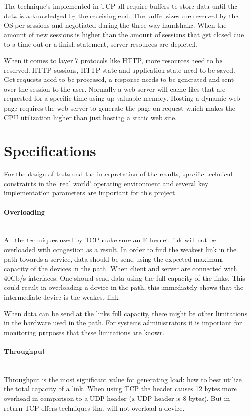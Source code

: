 The technique's implemented in TCP all require buffers to store data until the data is acknowledged by the receiving end.
The buffer sizes are reserved by the OS per sessions and negotiated during the three way handshake.  
When the amount of new sessions is higher than the amount of sessions that get closed due to a time-out or a finish statement, server resources are depleted.

When it comes to layer 7 protocols like HTTP, more resources need to be reserved. HTTP sessions, HTTP state and application state need to be saved. Get requests need to be processed, a response needs to be generated and sent over the session to the user. Normally a web server will cache files that are requested for a specific time using up valuable memory. Hosting a dynamic web page requires the web server to generate the page on request which makes the CPU utilization higher than just hosting a static web site. 

\section{Specifications}\label{sec:specifications}
For the design of tests and the interpretation of the results, specific technical constraints in the 'real world' operating environment and several key implementation parameters are important for this project.

\paragraph{Overloading}\label{par:overload}\mbox{}\\
All the techniques used by TCP make sure an Ethernet link will not be overloaded with congestion as a result. 
In order to find the weakest link in the path towards a service, data should be send using the expected maximum capacity of the devices in the path.
When client and server are connected with 40Gb/s interfaces. One should send data using the full capacity of the links.
This could result in overloading a device in the path, this immediately shows that the intermediate device is the weakest link.

When data can be send at the links full capacity, there might be other limitations in the hardware used in the path.  
For systems administrators it is important for monitoring purposes that these limitations are known.

\paragraph{Throughput}\label{par:throughput}\mbox{}\\
Throughput is the most significant value for generating load: how to best utilize the total capacity of a link. When using TCP the header causes 12 bytes more overhead in comparison to a UDP header (a UDP header is 8 bytes). But in return TCP offers techniques that will not overload a device. 

